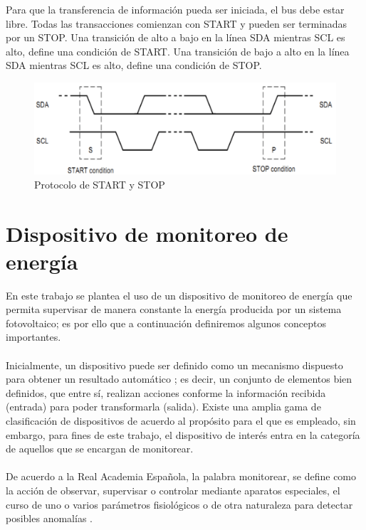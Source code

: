 Para que la transferencia de información pueda ser iniciada, el bus debe estar libre. Todas las transacciones comienzan con START y pueden ser terminadas por un STOP.
Una transición de alto a bajo en la línea SDA mientras SCL es alto, define una condición de START.
Una transición de bajo a alto en la línea SDA mientras SCL es alto, define una condición de STOP.

\begin{figure}[H]
	\centering
	\includegraphics[scale=.25]{Capitulo2/images/startstop.png}
	\caption{Protocolo de START y STOP}
	\label{fig:}
\end{figure}




\section{Dispositivo de monitoreo de energía}
En este trabajo se plantea el uso de un dispositivo de monitoreo de energía que permita supervisar de manera constante la energía producida por un sistema fotovoltaico; es por ello que a continuación definiremos algunos conceptos importantes.
\paragraph{}
Inicialmente, un dispositivo puede ser definido como un mecanismo dispuesto para obtener un resultado automático \citep{MarcoTeorico11}; es decir, un conjunto de elementos bien definidos, que entre sí, realizan acciones conforme la información recibida (entrada) para poder transformarla (salida).
Existe una amplia gama de clasificación de dispositivos de acuerdo al propósito para el que es empleado, sin embargo, para fines de este trabajo, el dispositivo de interés entra en la categoría de aquellos que se encargan de monitorear. 
\paragraph{}
De acuerdo a la Real Academia Española, la palabra monitorear, se define como la acción de observar, supervisar o controlar mediante aparatos especiales, el curso de uno o varios parámetros fisiológicos o de otra naturaleza para detectar posibles anomalías \citep{MarcoTeorico12}.
